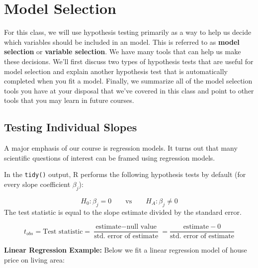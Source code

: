 \documentclass[
]{book}
\newenvironment{Shaded}{\begin{snugshade}}{\end{snugshade}}
\newcommand{\KeywordTok}[1]{\textcolor[rgb]{0.13,0.29,0.53}{\textbf{#1}}}
\newcommand{\NormalTok}[1]{#1}
\newcommand{\OperatorTok}[1]{\textcolor[rgb]{0.81,0.36,0.00}{\textbf{#1}}}
\newcommand{\StringTok}[1]{\textcolor[rgb]{0.31,0.60,0.02}{#1}}
\begin{document}
\hypertarget{model-selection}{%
\section{Model Selection}\label{model-selection}}

For this class, we will use hypothesis testing primarily as a way to help us decide which variables should be included in an model. This is referred to as \textbf{model selection} or \textbf{variable selection}. We have many tools that can help us make these decisions. We'll first discuss two types of hypothesis tests that are useful for model selection and explain another hypothesis test that is automatically completed when you fit a model. Finally, we summarize all of the model selection tools you have at your disposal that we've covered in this class and point to other tools that you may learn in future courses.

\hypertarget{testing-individual-slopes}{%
\subsection{Testing Individual Slopes}\label{testing-individual-slopes}}

A major emphasis of our course is regression models. It turns out that many scientific questions of interest can be framed using regression models.

In the \texttt{tidy()} output, R performs the following hypothesis tests by default (for every slope coefficient \(\beta_j\)):

\[H_0: \beta_j = 0 \qquad \text{vs} \qquad H_A: \beta_j \neq 0\]
The test statistic is equal to the slope estimate divided by the standard error.

\[t_{obs} = \text{Test statistic} = \frac{\text{estimate} - \text{null value}}{\text{std. error of estimate}} = \frac{\text{estimate} - 0}{\text{std. error of estimate}} \]

\textbf{Linear Regression Example:} Below we fit a linear regression model of house price on living area:

\begin{Shaded}
\end{Shaded}
\end{document}
